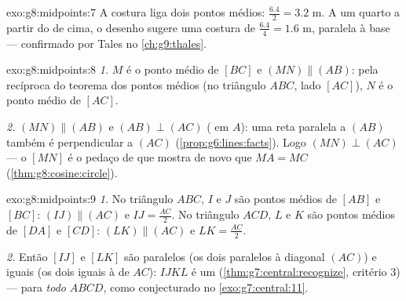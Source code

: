 \begin{solution}{exo:g8:midpoints:7}
A costura liga dois pontos médios: $\frac{6.4}{2} = 3.2$ m. A um
quarto a partir do  de cima, o desenho sugere uma costura de
$\frac{6.4}{4} = 1.6$ m, paralela à base --- confirmado por Tales no
\cref{ch:g9:thales}.
\end{solution}

\begin{solution}{exo:g8:midpoints:8}
\emph{1.} $M$ é o ponto médio de $[BC]$ e $(MN) \parallel (AB)$: pela
recíproca do teorema dos pontos médios (no triângulo $ABC$, lado
$[AC]$), $N$ é o ponto médio de $[AC]$.

\emph{2.} $(MN) \parallel (AB)$ e $(AB) \perp (AC)$ ( em
$A$): uma reta paralela a $(AB)$ também é perpendicular a $(AC)$
(\cref{prop:g6:lines:facts}). Logo $(MN) \perp (AC)$ --- o 
$[MN]$ é o pedaço de  que mostra de novo que $MA = MC$
(\cref{thm:g8:cosine:circle}).
\end{solution}

\begin{solution}{exo:g8:midpoints:9}
\emph{1.} No triângulo $ABC$, $I$ e $J$ são pontos médios de $[AB]$ e
$[BC]$: $(IJ) \parallel (AC)$ e $IJ = \frac{AC}{2}$. No triângulo
$ACD$, $L$ e $K$ são pontos médios de $[DA]$ e $[CD]$:
$(LK) \parallel (AC)$ e $LK = \frac{AC}{2}$.

\emph{2.} Então $[IJ]$ e $[LK]$ são paralelos (os dois paralelos à
diagonal $(AC)$) e iguais (os dois iguais à  de $AC$): $IJKL$ é
um  (\cref{thm:g7:central:recognize}, critério 3) ---
para \emph{todo}  $ABCD$, como conjecturado no
\cref{exo:g7:central:11}.
\end{solution}

